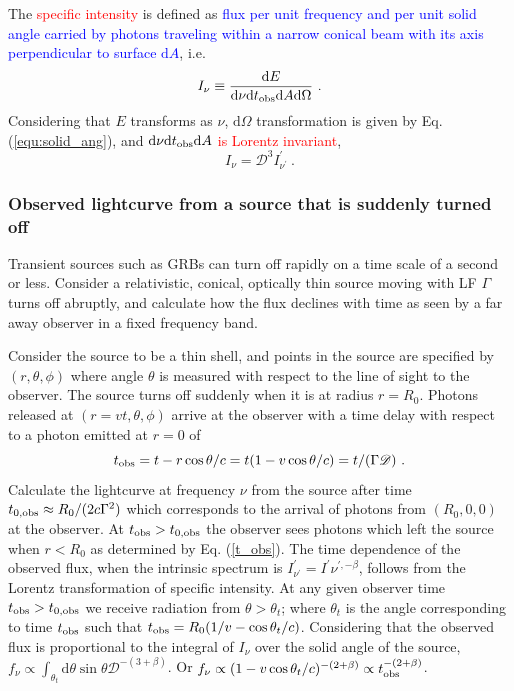 \documentclass[12pt,a4paper]{article}
\newcommand{\dif}{\mathrm{d}}
\begin{document}
The \textcolor{red}{specific intensity} is defined as \textcolor{blue}{flux per unit frequency and per unit solid angle carried by photons traveling within a narrow conical beam with its axis perpendicular to surface $\dif A$}, i.e.
\begin{equation}
I_\nu \equiv \dfrac{\dif E}{\dif \nu \dif t_{\rm obs} \dif A \dif \Omega} ~. 
\end{equation}
Considering that $E$ transforms as $\nu$, $\dif \Omega$ transformation is given by Eq. (\ref{equ:solid_ang}), and \textcolor{red}{$\dif \nu \dif t_{\rm obs} \dif A$ is Lorentz invariant}, 
\begin{equation}
I_\nu = \mathscr D^3 I^\prime_{\nu^\prime} ~.
\end{equation}

\subsubsection{Observed lightcurve from a source that is suddenly turned off}
Transient sources such as GRBs can turn off rapidly on a time scale of a second or less. Consider a relativistic, conical, optically thin source moving with LF $\Gamma$ turns off abruptly, and calculate how the flux declines with time as seen by a far away observer in a fixed frequency band.

Consider the source to be a thin shell, and points in the source are specified by $(r, \theta, \phi)$ where angle $\theta$ is measured with respect to the line of sight to the observer. The source turns off suddenly when it is at radius $r = R_0$. Photons released at $(r = vt, \theta, \phi)$ arrive at the observer with a time delay with respect to a photon emitted at $r = 0$ of
\begin{equation}
t_{\rm obs} = t - r \cos \theta/c =t(1- v\cos \theta/c) = t/(\Gamma \mathscr D) ~.
\label{t_obs}
\end{equation}
Calculate the lightcurve at frequency $\nu$ from the source after time $t_{0, \rm obs} \approx R_0/(2c\Gamma^2)$ which corresponds to the arrival of photons from $(R_0, 0, 0)$ at the observer. At $t_{\rm obs} > t_{0, \rm obs}$ the observer sees photons which left the source when $r < R_0$ as determined by Eq. (\ref{t_obs}). The time dependence of the observed flux, when the intrinsic spectrum is $I^\prime_{\nu^\prime} = I^\prime \nu^{\prime, -\beta}$, follows from the Lorentz transformation of specific intensity. At any given observer time $t_{\rm obs} > t_{0, \rm obs}$ we receive radiation from $\theta > \theta_t$; where $\theta_t$ is the angle corresponding to time $t_{\rm obs}$ such that $t_{\rm obs} = R_0 (1/v -\cos \theta_t /c)$. Considering that the observed flux is proportional to the integral of $I_\nu$ over the solid angle of the source, $f_\nu \propto \int_{\theta_t} \dif \theta \sin \theta \mathscr D^{-(3+\beta)}$. Or $f_\nu \propto (1 - v \cos \theta_t /c)^{-(2+\beta)} \propto t^{-(2+\beta)}_{\rm obs}$. 
\end{document}
